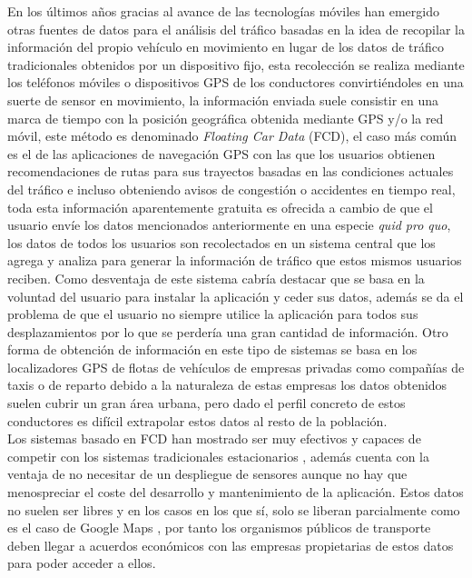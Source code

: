 \documentclass[../proyecto.tex]{subfiles}
\begin{document}
En los últimos años gracias al avance de las tecnologías móviles han emergido otras fuentes de datos para el análisis del tráfico basadas en la idea de recopilar la información del propio vehículo en movimiento en lugar de los datos de tráfico tradicionales obtenidos por un dispositivo fijo, esta recolección se realiza mediante los teléfonos móviles o dispositivos GPS de los conductores convirtiéndoles en una suerte de sensor en movimiento, la información enviada suele consistir en una marca de tiempo con la posición geográfica obtenida mediante GPS y/o la red móvil, este método es denominado \textit{Floating Car Data} (FCD), el caso más común es el de las aplicaciones de navegación GPS con las que los usuarios obtienen recomendaciones de rutas para sus trayectos basadas en las condiciones actuales del tráfico e incluso obteniendo avisos de congestión o accidentes en tiempo real, toda esta información aparentemente gratuita es ofrecida a cambio de que el usuario envíe los datos mencionados anteriormente en una especie \textit{quid pro quo}, los datos de todos los usuarios son recolectados en un sistema central que los agrega y analiza para generar la información de tráfico que estos mismos usuarios reciben. Como desventaja de este sistema cabría destacar que se basa en la voluntad del usuario para instalar la aplicación y ceder sus datos, además se da el problema de que el usuario no siempre utilice la aplicación para todos sus desplazamientos por lo que se perdería una gran cantidad de información. Otro forma de obtención de información en este tipo de sistemas se basa en los localizadores GPS de flotas de vehículos de empresas privadas como compañías de taxis o de reparto \cite{HUANG2018318} debido a la naturaleza de estas empresas los datos obtenidos suelen cubrir un gran área urbana, pero dado el perfil concreto de estos conductores es difícil extrapolar estos datos al resto de la población.\\

Los sistemas basado en FCD han mostrado ser muy efectivos y capaces de competir con los sistemas tradicionales estacionarios \cite{KESSLER2018299} \cite{NARANJO2010}  \cite{KESSLER2018299} \cite{GUILLAUME2008}, además cuenta con la ventaja de no necesitar de un despliegue de sensores aunque no hay que menospreciar el coste del desarrollo y mantenimiento de la aplicación. Estos datos no suelen ser libres y en los casos en los que sí, solo se liberan parcialmente como es el caso de Google Maps \cite{LI20194}, por tanto los organismos públicos de transporte deben llegar a acuerdos económicos con las empresas propietarias de estos datos para poder acceder a ellos.\\
\end{document}
